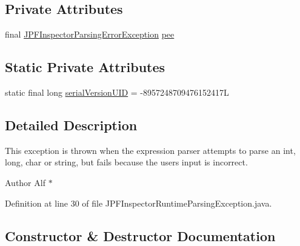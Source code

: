 \subsection*{Private Attributes}
\begin{DoxyCompactItemize}
\item 
final \hyperlink{classgov_1_1nasa_1_1jpf_1_1inspector_1_1exceptions_1_1_j_p_f_inspector_parsing_error_exception}{J\+P\+F\+Inspector\+Parsing\+Error\+Exception} \hyperlink{classgov_1_1nasa_1_1jpf_1_1inspector_1_1utils_1_1parser_1_1_j_p_f_inspector_runtime_parsing_exception_a58fe9654b65bbe9bd7ee4be5d40f2001}{pee}
\end{DoxyCompactItemize}
\subsection*{Static Private Attributes}
\begin{DoxyCompactItemize}
\item 
static final long \hyperlink{classgov_1_1nasa_1_1jpf_1_1inspector_1_1utils_1_1parser_1_1_j_p_f_inspector_runtime_parsing_exception_a1da637d80b18f37c886632e86799b1b4}{serial\+Version\+U\+ID} = -\/8957248709476152417L
\end{DoxyCompactItemize}


\subsection{Detailed Description}
This exception is thrown when the expression parser attempts to parse an int, long, char or string, but fails because the user\textquotesingle{}s input is incorrect. 

\begin{DoxyAuthor}{Author}
Alf $\ast$ 
\end{DoxyAuthor}


Definition at line 30 of file J\+P\+F\+Inspector\+Runtime\+Parsing\+Exception.\+java.



\subsection{Constructor \& Destructor Documentation}
